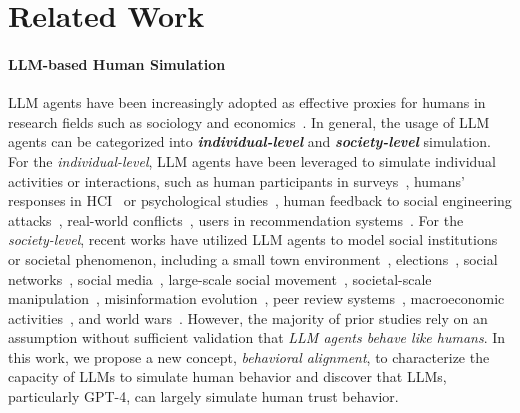 
\section{Related Work}
\label{Related Work}
\paragraph{LLM-based Human Simulation}
LLM agents have been increasingly adopted as effective proxies for humans in research fields such as sociology and economics~\citep{xu2024ai,NBERw31122,gao2023large}.
In general, the usage of LLM agents can be categorized into \textbf{\textit{individual-level}} and \textbf{\textit{society-level}} simulation.
For the \textit{individual-level}, LLM agents have been leveraged to simulate individual activities or interactions, such as  human participants in surveys~\citep{argyle2023out}, humans' responses in HCI~\citep{hamalainen2023evaluating} or psychological studies~\citep{dillion2023can}, human feedback to social engineering attacks~\citep{asfour2023harnessing}, real-world conflicts~\citep{shaikh2023rehearsal}, users in recommendation systems~\citep{wang2023recagent,zhang2023generative}. 
For the \textit{society-level}, recent works have utilized LLM agents to model  social institutions or societal phenomenon, including a small town environment~\citep{park2023generative}, elections~\citep{zhang2024electionsim}, social networks~\citep{gao2023s3}, 
social media~\citep{tornberg2023simulating,rossetti2024social}, large-scale social movement~\citep{mou2024unveiling}, societal-scale manipulation~\citep{touzel2024simulation}, misinformation evolution~\citep{liu2024tiny}, peer review systems~\citep{jin2024agentreview},
macroeconomic activities~\citep{li2023large}, 
and world wars~\citep{hua2023war}. However, the majority of prior studies rely on an assumption without sufficient validation that \textit{LLM agents  behave like humans}. 
In this work, we propose a new concept, \textit{behavioral alignment}, to characterize the capacity of LLMs to simulate human behavior and discover that LLMs, particularly GPT-4, can largely simulate human trust behavior.




